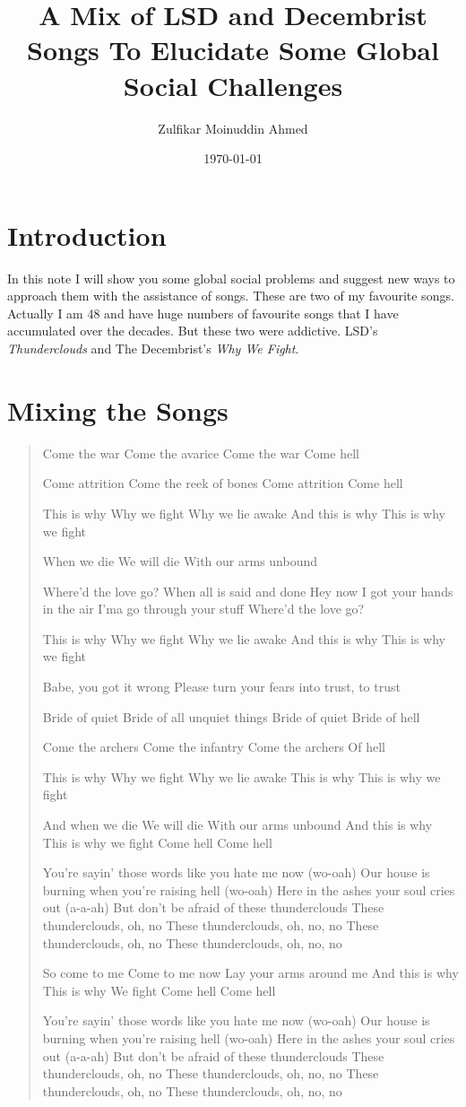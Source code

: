\documentclass{amsart}
\title{A Mix of LSD and Decembrist Songs To Elucidate Some Global Social Challenges}
\author{Zulfikar Moinuddin Ahmed}
\date{\today}
\begin{document}
\maketitle

\section{Introduction}
In this note I will show you some global social problems and suggest new ways to approach them with the assistance of songs.  These are two of my favourite songs.  Actually I am 48 and have huge numbers of favourite songs that I have accumulated over the decades.  But these two were addictive.  LSD's {\em Thunderclouds} and The Decembrist's {\em Why We Fight}.  

\section{Mixing the Songs}

\begin{verse}
Come the war
Come the avarice
Come the war
Come hell

Come attrition
Come the reek of bones
Come attrition
Come hell

This is why
Why we fight
Why we lie awake
And this is why
This is why we fight

When we die
We will die
With our arms unbound

Where’d the love go?
When all is said and done
Hey now I got your hands in the air
I’ma go through your stuff
Where’d the love go?

This is why
Why we fight
Why we lie awake
And this is why
This is why we fight

Babe, you got it wrong
Please turn your fears into trust, to trust

Bride of quiet
Bride of all unquiet things
Bride of quiet
Bride of hell

Come the archers
Come the infantry
Come the archers
Of hell

This is why
Why we fight
Why we lie awake
This is why
This is why we fight

And when we die
We will die
With our arms unbound
And this is why
This is why we fight
Come hell
Come hell

You’re sayin’ those words like you hate me now (wo-oah)
Our house is burning when you’re raising hell (wo-oah)
Here in the ashes your soul cries out (a-a-ah)
But don’t be afraid of these thunderclouds
These thunderclouds, oh, no
These thunderclouds, oh, no, no
These thunderclouds, oh, no
These thunderclouds, oh, no, no

So come to me
Come to me now
Lay your arms around me
And this is why
This is why
We fight
Come hell
Come hell

You’re sayin’ those words like you hate me now (wo-oah)
Our house is burning when you’re raising hell (wo-oah)
Here in the ashes your soul cries out (a-a-ah)
But don’t be afraid of these thunderclouds
These thunderclouds, oh, no
These thunderclouds, oh, no, no
These thunderclouds, oh, no
These thunderclouds, oh, no, no

\end{verse}
\end{document}
